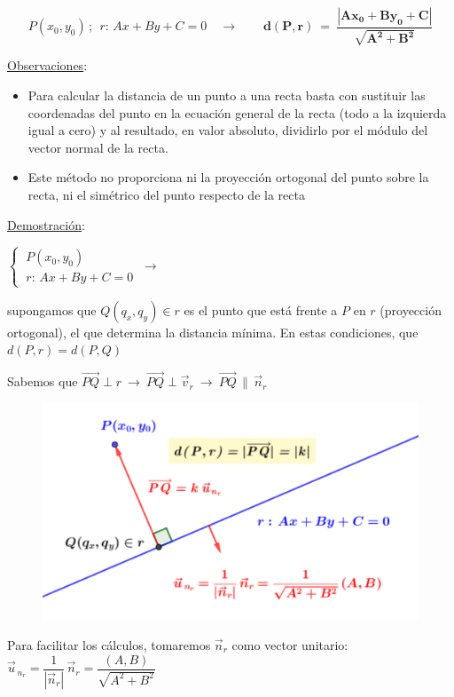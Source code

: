 \vspace{5mm}
\begin{theorem}

$$ P(x_0, y_0)\, ; \  \ r:\, Ax+By+C=0 \quad \to \qquad \boldsymbol{ d(P,r) \ = \ \dfrac{|Ax_0+By_0+C|}{\sqrt{A^2+B^2}} }$$	
\end{theorem}
\underline{Observaciones}:
\begin{itemize}
\item Para calcular la distancia de un punto a una recta basta con sustituir las coordenadas del punto en la ecuación general de la recta (todo a la izquierda igual a cero) y al resultado, en valor absoluto, dividirlo por el módulo del vector normal de la recta.
\item Este método no proporciona ni la proyección ortogonal del punto sobre la recta, ni el simétrico del punto respecto de la recta
\end{itemize}
\vspace{3mm} \underline{Demostración}:
\begin{multicols}{2}
$\begin{cases} \ P(x_0,y_0) \\ \ r:\, Ax+By+C=0 \end{cases} \ \to \ $ 

supongamos que $Q(q_x,q_y)\in r$ es el punto que está frente a $P$ en $r$ (proyección ortogonal), el que determina la distancia mínima. En estas condiciones,  que $d(P,r)=d(P,Q)$

Sabemos que $\overrightarrow{PQ} \perp r \ \to \ \overrightarrow{PQ} \perp \vec v_r \ \to \ \overrightarrow{PQ}\, \parallel \, \vec n_r$
\begin{figure}[H]
	\centering
	\includegraphics[width=.5\textwidth]{img-ga/ga23.png}
\end{figure}
\end{multicols}

Para facilitar los cálculos, tomaremos $\vec n_r$ como vector unitario: $\vec u_{\, n_r}=\dfrac 1{|\vec n_r|}\, \vec n_r=\dfrac{(A,B)}{\sqrt{A^2+B^2}}$

